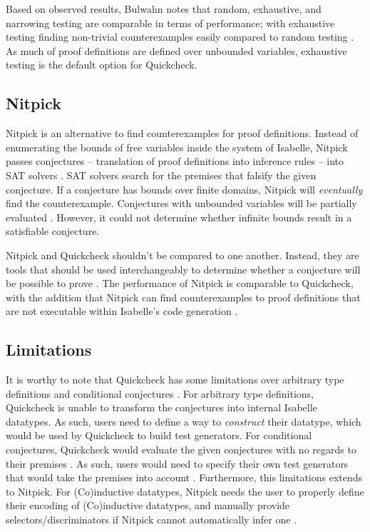 Based on observed results, Bulwahn notes that random, exhaustive, and narrowing testing are comparable in terms of performance; with 
exhaustive testing finding non-trivial counterexamples easily compared to random testing \cite[Sec. 7]{isabelleQuickcheck}. As much of  
proof definitions are defined over unbounded variables, exhaustive testing is the default option for Quickcheck.

\subsection{Nitpick}
\label{sec:Nitpick}

Nitpick is an alternative to find counterexamples for proof definitions. Instead of enumerating the bounds of free variables inside the 
system of Isabelle, Nitpick passes conjectures -- translation of proof definitions into inference rules -- into SAT solvers 
\cite[Sec. 5]{isabelleProof}. SAT solvers search for the premises that falsify the given conjecture. If a conjecture 
has bounds over finite domains, Nitpick will \emph{eventually} find the counterexample. Conjectures with unbounded variables will be partially 
evaluated \cite[Sec. 5.2]{isabelleProof}. However, it could not determine whether infinite bounds result in a satisfiable conjecture.

Nitpick and Quickcheck shouldn't be compared to one another. Instead, they are tools that should be used interchangeably to determine 
whether a conjecture will be possible to prove \cite{isabelleQuickcheck}. The performance of Nitpick is comparable to Quickcheck, with 
the addition that Nitpick can find counterexamples to proof definitions that are not executable within Isabelle's code generation 
\cite[Sec. 7]{isabelleQuickcheck}.

\subsection{Limitations}

It is worthy to note that Quickcheck has some limitations over arbitrary type definitions \cite[Sec. 3.1]{isabelleQuickcheck} 
and conditional conjectures \cite[Sec. 4]{isabelleQuickcheck}. For arbitrary type definitions, Quickcheck is unable to transform the conjectures 
into internal Isabelle datatypes. As such, users need to define a way to \emph{construct} their datatype, which would be used by Quickcheck 
to build test generators. For conditional conjectures, Quickcheck would evaluate the given conjectures with no regards to their premises 
\cite[Sec. 4]{isabelleQuickcheck}. As such, users would need to specify their own test generators that would take the premises into account 
\cite[Sec. 4.1]{isabelleQuickcheck}. Furthermore, this limitations extends to Nitpick. For (Co)inductive datatypes, Nitpick needs the user to 
properly define their encoding of (Co)inductive datatypes, and manually provide selectors/discriminators if Nitpick cannot automatically infer 
one \cite[Sec. 5.4]{isabelleProof}.

